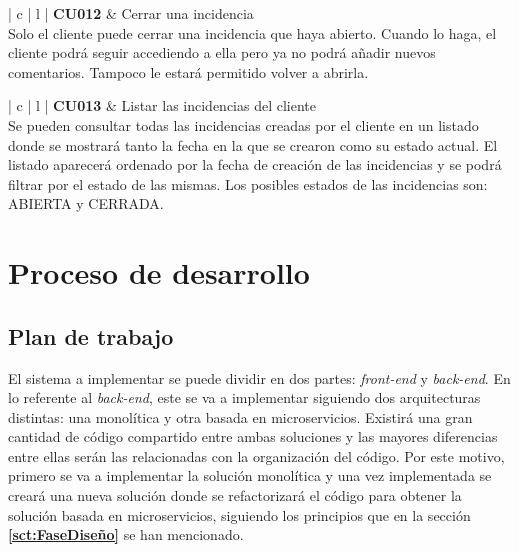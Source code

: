 \documentclass[11pt,spanish,listoffigures]{tfgetsinf}
\begin{document}
\begin{center}
\begin{tabular}{ | c | l | }
\hline
\textbf{ CU012 } & Cerrar una incidencia \\
\hline
{}
{
Solo el cliente puede cerrar una incidencia que haya abierto. Cuando lo haga, el cliente podrá seguir accediendo a ella pero ya no podrá añadir nuevos comentarios. Tampoco le estará permitido volver a abrirla.
} \\
\hline
\end{tabular}
\end{center}

\begin{center}
\begin{tabular}{ | c | l | }
\hline
\textbf{ CU013 } & Listar las incidencias del cliente \\
\hline
{}
{
Se pueden consultar todas las incidencias creadas por el cliente en un listado donde se mostrará tanto la fecha en la que se crearon como su estado actual. El listado aparecerá ordenado por la fecha de creación de las incidencias y se podrá filtrar por el estado de las mismas. Los posibles estados de las incidencias son: ABIERTA y CERRADA.
} \\
\hline
\end{tabular}
\end{center}

%

\chapter{Proceso de desarrollo}

\section{Plan de trabajo} \label{sct:PlanTrabajo}

El sistema a implementar se puede dividir en dos partes: \textit{front-end} y \textit{back-end}. En lo referente al \textit{back-end}, este se va a implementar siguiendo dos arquitecturas distintas: una monolítica y otra basada en microservicios. Existirá una gran cantidad de código compartido entre ambas soluciones y las mayores diferencias entre ellas serán las relacionadas con la organización del código. Por este motivo, primero se va a implementar la solución monolítica y una vez implementada se creará una nueva solución donde se refactorizará el código para obtener la solución basada en microservicios, siguiendo los principios que en la sección \textbf{\ref{sct:FaseDiseño} } se han mencionado.
\end{document}
